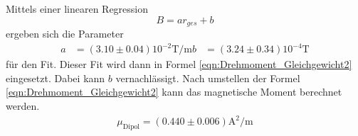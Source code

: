 Mittels einer linearen Regression \cite{scipy} 
\begin{equation*}
    B = ar_{ges} + b
\end{equation*}
ergeben sich die Parameter 
\begin{align*}
    a &= (3.10 \pm 0.04) 10^{-2}\unit{\tesla\per\metre}
    b &= (3.24 \pm 0.34) 10^{-4} \unit{\tesla}
\end{align*}
für den Fit. Dieser Fit wird dann in Formel \eqref{eqn:Drehmoment_Gleichgewicht2} eingesetzt. Dabei kann $b$ vernachlässigt. Nach umstellen der Formel 
\eqref{eqn:Drehmoment_Gleichgewicht2} kann das magnetische Moment berechnet werden.
\begin{align*}
    \mu_{\text{Dipol}} = (0.440 \pm 0.006) \unit{\square\ampere\per\metre}
\end{align*}
